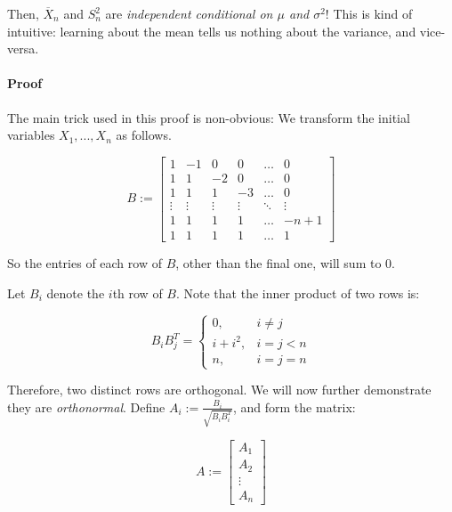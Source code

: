 \documentclass[a4paper]{article}
\begin{document}
                Then, $\overline X_n$ and $S_n^2$ are \textit{independent
                conditional on $\mu$ and $\sigma^2$}! This is kind of intuitive:
                learning about the mean tells us nothing about the variance, and
                vice-versa.

                \paragraph{Proof}
                    The main trick used in this proof is non-obvious: We
                    transform the initial variables $X_1, ..., X_n$ as follows.

                    \[
                        B := \begin{bmatrix}1 & -1 & 0 & 0 & \dots & 0 \\
                            1 & 1 & -2 & 0 & \dots & 0 \\
                            1 & 1 & 1 & -3 & \dots & 0 \\
                            \vdots & \vdots & \vdots & \vdots & \ddots &
                                \vdots \\
                            1 & 1 & 1 & 1 & \dots & -n + 1 \\
                            1 & 1 & 1 & 1 & \dots & 1
                        \end{bmatrix}
                    \]

                    So the entries of each row of $B$, other than the final one,
                    will sum to $0$.

                    Let $B_i$ denote the $i$th row of $B$. Note that the inner
                    product of two rows is:

                    \[
                        B_iB_j^T = \begin{cases}
                            0, & i \neq j \\
                            i + i^2, & i = j < n \\
                            n, & i = j = n
                        \end{cases}
                    \]

                    Therefore, two distinct rows are orthogonal. We will now
                    further demonstrate they are \textit{orthonormal}. Define
                    $A_i := \frac{B_i}{\sqrt{B_iB_i^T}}$, and form the matrix:

                    \[
                        A := \begin{bmatrix}A_1 \\ A_2 \\ \vdots \\ A_n
                        \end{bmatrix}
                    \]
\end{document}
